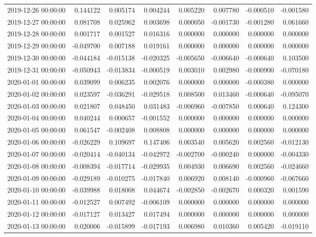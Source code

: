 \begin{tabular}{lrrrrrrr}
2019-12-26 00:00:00 & 0.144122 & 0.005174 & 0.004244 & 0.005220 & 0.007780 & -0.000510 & -0.001580 \\
2019-12-27 00:00:00 & 0.081708 & 0.025962 & 0.003698 & 0.000050 & -0.001730 & -0.001280 & 0.061660 \\
2019-12-28 00:00:00 & 0.001717 & 0.001527 & 0.016316 & 0.000000 & 0.000000 & 0.000000 & 0.000000 \\
2019-12-29 00:00:00 & -0.049700 & 0.007188 & 0.019161 & 0.000000 & 0.000000 & 0.000000 & 0.000000 \\
2019-12-30 00:00:00 & -0.044184 & -0.015138 & -0.020325 & -0.005650 & -0.006640 & -0.000640 & 0.103500 \\
2019-12-31 00:00:00 & -0.050943 & -0.013834 & -0.000519 & 0.003010 & 0.002980 & -0.000900 & -0.070180 \\
2020-01-01 00:00:00 & 0.039099 & 0.006235 & 0.002076 & 0.000000 & 0.000000 & -0.000380 & 0.000000 \\
2020-01-02 00:00:00 & 0.023597 & -0.036291 & -0.029518 & 0.008500 & 0.013460 & -0.000640 & -0.095070 \\
2020-01-03 00:00:00 & 0.021807 & 0.048450 & 0.031483 & -0.006960 & -0.007850 & 0.000640 & 0.124300 \\
2020-01-04 00:00:00 & 0.040244 & 0.000657 & -0.001552 & 0.000000 & 0.000000 & 0.000000 & 0.000000 \\
2020-01-05 00:00:00 & 0.061547 & -0.002408 & 0.008808 & 0.000000 & 0.000000 & 0.000000 & 0.000000 \\
2020-01-06 00:00:00 & -0.026229 & 0.109697 & 0.147406 & 0.003540 & 0.005620 & 0.002560 & -0.012130 \\
2020-01-07 00:00:00 & -0.020414 & -0.040134 & -0.042972 & -0.002700 & -0.000240 & 0.000000 & -0.004330 \\
2020-01-08 00:00:00 & -0.008394 & -0.017714 & -0.029935 & 0.004930 & 0.006690 & 0.002560 & -0.024660 \\
2020-01-09 00:00:00 & -0.029189 & -0.010275 & -0.017840 & 0.006920 & 0.008140 & -0.000960 & -0.067660 \\
2020-01-10 00:00:00 & -0.039988 & 0.018008 & 0.044674 & -0.002850 & -0.002670 & 0.000320 & 0.001590 \\
2020-01-11 00:00:00 & -0.012527 & 0.007492 & -0.006109 & 0.000000 & 0.000000 & 0.000000 & 0.000000 \\
2020-01-12 00:00:00 & -0.017127 & 0.013427 & 0.017494 & 0.000000 & 0.000000 & 0.000000 & 0.000000 \\
2020-01-13 00:00:00 & 0.020006 & -0.015899 & -0.017193 & 0.006980 & 0.010360 & 0.005420 & -0.019110 \\

\end{tabular}
